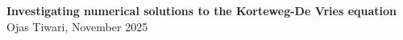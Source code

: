 \documentclass[a4paper,11pt]{article}
\begin{document}
\begin{center}
\Large{\textbf{Investigating numerical solutions to the Korteweg-De Vries equation}}\\ 
\vspace{1em}
\large{Ojas Tiwari, November  2025}\\
\end{center}




\clearpage




\end{document}
